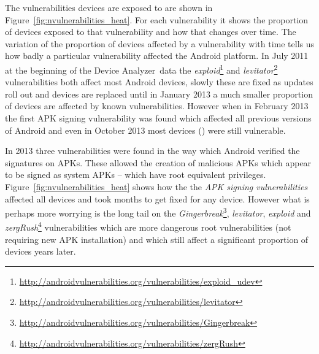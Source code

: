 \documentclass[conference,a4paper,twoside]{IEEEtran}
\newcommand{\da}{Device Analyzer}
\begin{document}
The vulnerabilities devices are exposed to are shown in Figure~\ref{fig:nvulnerabilities_heat}.
For each vulnerability it shows the proportion of devices exposed to that vulnerability and how that changes over time.
The variation of the proportion of devices affected by a vulnerability with time tells us how badly a particular vulnerability affected the Android platform.
In July 2011 at the beginning of the \da\ data the \emph{exploid}\footnote{\url{http://androidvulnerabilities.org/vulnerabilities/exploid_udev}} and \emph{levitator}\footnote{\url{http://androidvulnerabilities.org/vulnerabilities/levitator}} vulnerabilities both affect most Android devices, slowly these are fixed as updates roll out and devices are replaced until in January 2013 a much smaller proportion of devices are affected by known vulnerabilities.
However when in February 2013 the first APK signing vulnerability was found which affected all previous versions of Android and even in October 2013 most devices (\daVulnAPKDuplicateFileOctoberPerc) were still vulnerable.

In 2013 three vulnerabilities were found in the way which Android verified the signatures on APKs.
These allowed the creation of malicious APKs which appear to be signed as system APKs -- which have root equivalent privileges.
Figure~\ref{fig:nvulnerabilities_heat} shows how the the \emph{APK signing vulnerabilities} affected all devices and took months to get fixed for any device.
However what is perhaps more worrying is the long tail on the \emph{Gingerbreak}\footnote{\url{http://androidvulnerabilities.org/vulnerabilities/Gingerbreak}}, \emph{levitator}, \emph{exploid} and \emph{zergRush}\footnote{\url{http://androidvulnerabilities.org/vulnerabilities/zergRush}} vulnerabilities which are more dangerous root vulnerabilities (not requiring new APK installation) and which still affect a significant proportion of devices years later.
\end{document}

